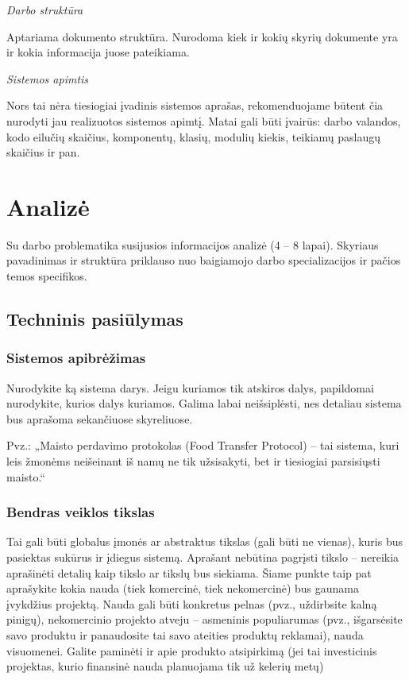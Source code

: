 \documentclass{ktuthesis}
\begin{document}
	\textit{Darbo struktūra}
	
	Aptariama dokumento struktūra. Nurodoma kiek ir kokių skyrių dokumente yra ir kokia informacija juose pateikiama.
	
	\textit{Sistemos apimtis}
	
	Nors tai nėra tiesiogiai įvadinis sistemos aprašas, rekomenduojame būtent čia nurodyti jau realizuotos sistemos apimtį. Matai gali būti įvairūs: darbo valandos, kodo eilučių skaičius, komponentų, klasių, modulių kiekis, teikiamų paslaugų skaičius ir pan.
	
	\clearpage
	
	\section{Analizė}
	
	Su darbo problematika susijusios informacijos analizė (4 – 8 lapai). Skyriaus pavadinimas ir struktūra priklauso nuo baigiamojo darbo specializacijos ir pačios temos specifikos.
	
	\subsection{Techninis pasiūlymas}
	
	\subsubsection{Sistemos apibrėžimas}
	
	Nurodykite ką sistema darys. Jeigu kuriamos tik atskiros dalys, papildomai nurodykite, kurios dalys kuriamos. Galima labai neišsiplėsti, nes detaliau sistema bus aprašoma sekančiuose skyreliuose.
	
	Pvz.: „Maisto perdavimo protokolas (Food Transfer Protocol) – tai sistema, kuri leis žmonėms neišeinant iš namų ne tik užsisakyti, bet ir tiesiogiai parsisiųsti maisto.“
	
	\subsubsection{Bendras veiklos tikslas}
	
	Tai gali būti globalus įmonės ar abstraktus tikslas (gali būti ne vienas), kuris bus pasiektas sukūrus ir įdiegus sistemą. Aprašant nebūtina pagrįsti tikslo – nereikia aprašinėti detalių kaip tikslo ar tikslų bus siekiama. Šiame punkte taip pat aprašykite kokia nauda (tiek komercinė, tiek nekomercinė) bus gaunama įvykdžius projektą. Nauda gali būti konkretus pelnas (pvz., uždirbsite kalną pinigų), nekomercinio projekto atveju – asmeninis populiarumas (pvz., išgarsėsite savo produktu ir panaudosite tai savo ateities produktų reklamai), nauda visuomenei. Galite paminėti ir apie produkto atsipirkimą (jei tai investicinis projektas, kurio finansinė nauda planuojama tik už kelerių metų)
	
\end{document}

